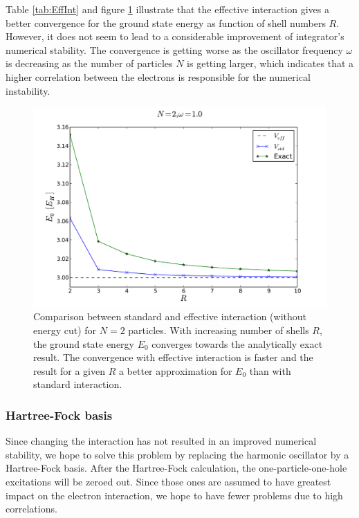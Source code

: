 Table \ref{tab:EffInt} and figure \ref{fig:stdeff} illustrate that the effective interaction gives a better convergence for the ground state energy as function of shell numbers $R$. However, it does not seem to lead to a considerable improvement of integrator's numerical stability. The convergence is getting worse as the oscillator frequency $\omega$ is decreasing as the number of particles $N$ is getting larger, which indicates that a higher correlation between the electrons is responsible for the numerical instability.

\begin{figure}
\begin{center}
\includegraphics[scale=0.4]{../Plots/stdeff.pdf}
\end{center}
\caption{Comparison between standard and effective interaction (without energy cut) for $N=2$ particles. With increasing number of shells $R$, the ground state energy $E_0$ converges towards the analytically exact result. The convergence with effective interaction is faster and the result for a given $R$ a better approximation for $E_0$ than with standard interaction.}
\label{fig:stdeff}
\end{figure}

\subsubsection{Hartree-Fock basis}
Since changing the interaction has not resulted in an improved numerical stability, we hope to solve this problem by replacing the harmonic oscillator by a Hartree-Fock basis. After the Hartree-Fock calculation, the one-particle-one-hole excitations will be zeroed out. Since those ones are assumed to have greatest impact on the electron interaction, we hope to have fewer problems due to high correlations.

